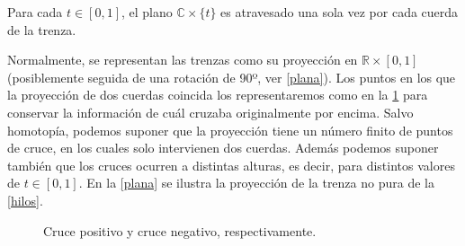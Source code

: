 \documentclass[bibtex, anon]{TEMat-article}
\newcommand{\R}{\mathbb{R}}
\newcommand{\CC}{\mathbb{C}}
\begin{document}
\begin{observacion}
	Para cada $t\in[0,1]$, el plano $\CC\times\{t\}$ es atravesado una sola vez por cada cuerda de la trenza. 
\end{observacion}

Normalmente, se representan las trenzas como su proyección en $\R\times[0,1]$ (posiblemente seguida de una rotación de 90º, ver \cref{plana}). Los puntos en los que la proyección de dos cuerdas coincida los representaremos como en la \cref{cruce} para conservar la información de cuál cruzaba originalmente por encima. Salvo homotopía, podemos suponer que la proyección tiene un número finito de puntos de cruce, en los cuales solo intervienen dos cuerdas. Además podemos suponer también que los cruces ocurren a distintas alturas, es decir, para distintos valores de $t\in[0,1]$. En la \cref{plana} se ilustra la proyección de la trenza no pura de la \cref{hilos}. 
\begin{figure}[h!]
	\centering
	
	\caption{Cruce positivo y cruce negativo, respectivamente.}\label{cruce}
	\end{figure}
\end{document}
